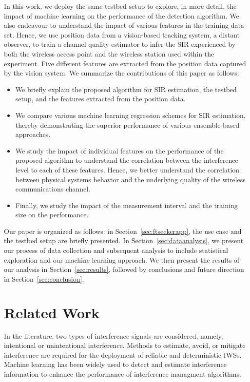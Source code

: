     In this work, we deploy the same testbed setup to explore, in more detail, the impact of machine learning on the performance of the detection algorithm.  We also endeavour to understand the impact of various features in the training data set. Hence, we use position data from a vision-based tracking system, a distant observer, to train a channel quality estimator to infer the SIR experienced by both the wireless access point and the wireless station used within the experiment. Five different features are extracted from the position data captured by the vision system. We summarize the contributions of this paper as follows:
    \begin{itemize}
        \item We briefly explain the proposed algorithm for SIR estimation, the testbed setup, and the features extracted from the position data.
        \item We compare various machine learning regression schemes for SIR estimation, thereby demonstrating the superior performance of various ensemble-based approaches.
        \item We study the impact of individual features on the performance of the proposed algorithm to understand the correlation between the interference level to each of these features. Hence, we better understand the correlation between physical systems behavior and the underlying quality of the wireless communications channel. 
        \item Finally, we study the impact of the measurement interval and the training size on the performance.
    \end{itemize}
    
    Our paper is organized as follows: in Section~\ref{sec:ftseekerapp}, the use case and the testbed setup are briefly presented. In Section~\ref{sec:dataanalysis}, we present our process of data collection and subsequent analysis to include statistical exploration and our machine learning approach. We then present the results of our analysis in Section~\ref{sec:results}, followed by conclusions and future direction in Section~\ref{sec:conclusion}.
    
\section{Related Work}    
In the literature, two types of interference signals are considered, namely, intentional or unintentional interference. Methods to estimate, avoid, or mitigate interference are required for the deployment of reliable and deterministic IWSs. Machine learning has been widely used to detect and estimate interference information to enhance the performance of interference managment algorithms.  
 
